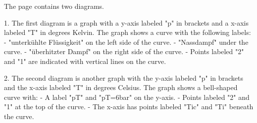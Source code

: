 The page contains two diagrams.

1. The first diagram is a graph with a y-axis labeled "p" in brackets and a x-axis labeled "T" in degrees Kelvin. The graph shows a curve with the following labels:
   - "unterkühlte Flüssigkeit" on the left side of the curve.
   - "Nassdampf" under the curve.
   - "überhitzter Dampf" on the right side of the curve.
   - Points labeled "2" and "1" are indicated with vertical lines on the curve.

2. The second diagram is another graph with the y-axis labeled "p" in brackets and the x-axis labeled "T" in degrees Celsius. The graph shows a bell-shaped curve with:
   - A label "pT" and "pT=6bar" on the y-axis.
   - Points labeled "2" and "1" at the top of the curve.
   - The x-axis has points labeled "Tic" and "Ti" beneath the curve.